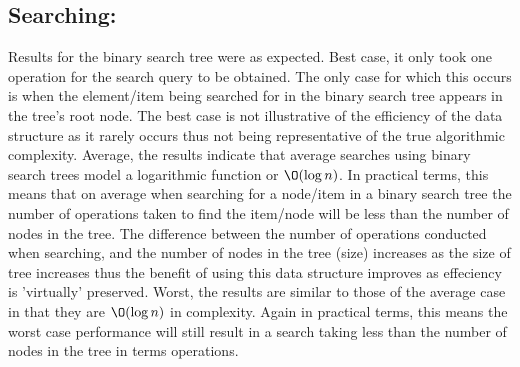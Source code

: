 \documentclass[10pt, a4paper]{article}
\begin{document}
        \subsection{Searching:}
        Results for the binary search tree were as expected. Best case, it only took one operation for the 
        search query to be obtained. The only case for which this occurs is when the element/item being searched for in 
        the binary search tree appears in the tree's root node. The best case is not illustrative of the efficiency of the
        data structure as it rarely occurs thus not being representative of the true algorithmic complexity. Average, the 
        results indicate that average searches using binary search trees model a logarithmic function or $\O(\log{}n)$. 
        In practical terms, this means that on average when searching for a node/item in a binary search tree the number
        of operations taken to find the item/node will be less than the number of nodes in the tree. The difference 
        between the number of operations conducted when searching, and the number of nodes in the tree (size) increases
        as the size of tree increases thus the benefit of using this data structure improves as effeciency is 'virtually' 
        preserved. Worst, the results are similar to those of the average case in that they are $\O(\log{}n)$ in 
        complexity. Again in practical terms, this means the worst case performance will still result in a search taking 
        less than the number of nodes in the tree in terms operations. 
\end{document}
